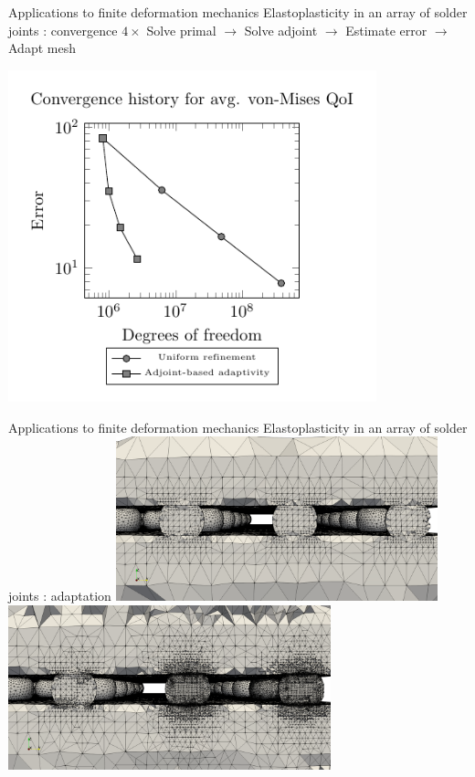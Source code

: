 \documentclass[fleqn]{beamer}
\begin{document}
\begin{frame}{Applications to finite deformation mechanics}
{Elastoplasticity in an array of solder joints : convergence}
$4 \times$ Solve primal $\rightarrow$ Solve adjoint $\rightarrow$ 
Estimate error $\rightarrow$ Adapt mesh \\
\vspace*{-1em}
\begin{center}
\includegraphics[width=0.8\textwidth]{../img/aut_solder_convergence}
\end{center}
\end{frame}


\begin{frame}{Applications to finite deformation mechanics}
{Elastoplasticity in an array of solder joints : adaptation}
\centering
\includegraphics[width=0.7\textwidth]{../img/aut_solder_mesh_initial} \\
\includegraphics[width=0.7\textwidth]{../img/aut_solder_mesh_final}
\end{frame}
\end{document}
